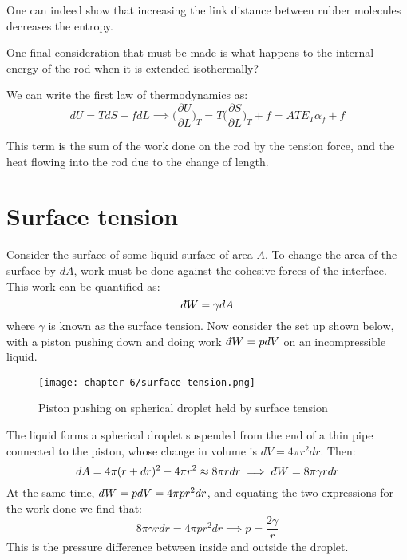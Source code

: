 \documentclass[a4paper,11pt,oneside]{book}
\newcommand{\dbar}{d\hspace*{-0.08em}\bar{}\hspace*{0.1em}}
\begin{document}
One can indeed show that increasing the link distance between rubber molecules decreases the entropy. 


One final consideration that must be made is what happens to the internal energy of the rod when it is extended isothermally? 


We can write the first law of thermodynamics as:
\begin{equation}
    dU = TdS + fdL \implies   \bigg(\frac{\partial U}{\partial L}\bigg)_T = T   \bigg(\frac{\partial S}{\partial L}\bigg)_T + f = ATE_T\alpha_f + f
\end{equation}

This term is the sum of the work done on the rod by the tension force, and the heat flowing into the rod due to the change of length. 


\section{Surface tension}
Consider the surface of some liquid surface of area $A$. To change the area of the surface by $dA$, work must be done against the cohesive forces of the interface. This work can be quantified as:
\begin{equation}
    \dbar W = \gamma dA
\end{equation}
where $\gamma$ is known as the surface tension. Now consider the set up shown below, with a piston pushing down and doing work $\dbar W = pdV$ on an incompressible liquid. 

\begin{figure}[h!]
    \centering
    \texttt{[image: chapter 6/surface tension.png]}
    \caption{Piston pushing on spherical droplet held by surface tension}
    \label{fig:my_label}
\end{figure}



The liquid forms a spherical droplet suspended from the end of a thin pipe connected to the piston, whose change in volume is $dV = 4\pi r^2 dr$. Then:
\begin{equation}
    dA = 4\pi (r+ dr)^2-4\pi r^2 \approx 8 \pi r dr \implies \dbar W = 8 \pi \gamma r dr
\end{equation}
At the same time,  $\dbar W = p dV = 4 \pi p r^2 dr$, and equating the two expressions for the work done we find that:
\begin{equation}
    8 \pi \gamma r dr = 4 \pi p r^2 dr \implies p = \frac{2\gamma}{r}
\end{equation}
This is the pressure difference between inside and outside the droplet. 
\end{document}

